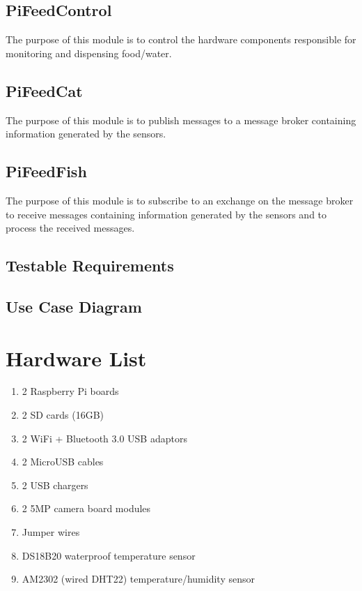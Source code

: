 \subsection{PiFeedControl}
The purpose of this module is to control the hardware components responsible
for monitoring and dispensing food/water.

\subsection{PiFeedCat}
The purpose of this module is to publish messages to a message broker containing
information generated by the sensors.

\subsection{PiFeedFish}
The purpose of this module is to subscribe to an exchange on the message broker
to receive messages containing information generated by the sensors and to
process the received messages.

\subsection{Testable Requirements}
\subsection{Use Case Diagram}

\section{Hardware List}
\begin{enumerate}

    \item 2 Raspberry Pi boards

    \item 2 SD cards (16GB)

    \item 2 WiFi + Bluetooth 3.0 USB adaptors

    \item 2 MicroUSB cables

    \item 2 USB chargers

    \item 2 5MP camera board modules

    \item Jumper wires

    \item DS18B20 waterproof temperature sensor

    \item AM2302 (wired DHT22) temperature/humidity sensor

\end{enumerate}

